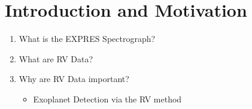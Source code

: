 \chapter{Introduction and Motivation} \label{chapter:introduction}
\begin{enumerate}
\item What is the EXPRES Spectrograph?
\item What are RV Data?
\item Why are RV Data important?

\begin{itemize}
\item Exoplanet Detection via the RV method
\end{itemize}

\end{enumerate}
